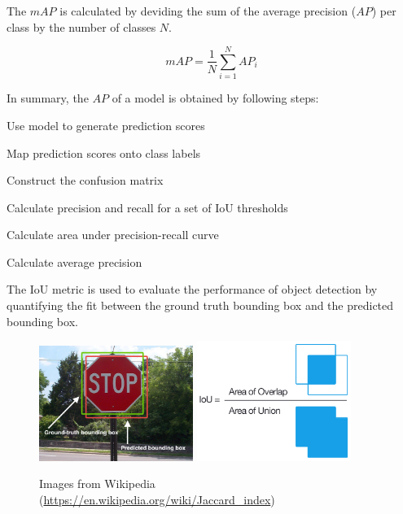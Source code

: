 \documentclass[]{article}
\begin{document}
	The $mAP$ is calculated by deviding the sum of the average precision ($AP$) per class by the number of classes $N$.
	
	\[
	mAP = \frac{1}{N} \sum_{i=1}^{N} AP_i
	\]
	
	In summary, the $AP$ of a model is obtained by following steps:
	
	\begin{center}
		\begin{compactenum}
			\item Use model to generate prediction scores
			\item Map prediction scores onto class labels
			\item Construct the confusion matrix
			\item Calculate precision and recall for a set of IoU thresholds
			\item Calculate area under precision-recall curve
			\item Calculate average precision
		\end{compactenum}
	\end{center}
	
	The IoU metric is used to evaluate the performance of object detection by quantifying the fit between the ground truth bounding box and the predicted bounding box.
	
	\begin{figure}[h]
		\centering
		\includegraphics[width=5cm]{Intersection_over_Union_-_object_detection_bounding_boxes.jpg}
		\includegraphics[width=5cm]{Intersection_over_Union_-_visual_equation.png}
		\caption{Images from Wikipedia \footnotesize{(\url{https://en.wikipedia.org/wiki/Jaccard_index})}}
	\end{figure}
	
\end{document}
